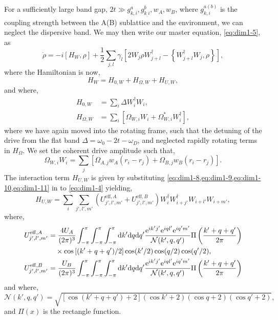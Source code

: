 For a sufficiently large band gap, \(2t \gg g_{k,i}^{a},g_{k_,i}^{b},w_{A},w_{B}\), where \(g_{k,i}^{a(b)}\) is the coupling strength between the A(B) sublattice and the environment, we can neglect the dispersive band. We may then write our master equation, \cref{eq:dim1-5}, as 
\begin{equation}
	\dot{\rho} = -i[H_{W}, \rho] + \frac{1}{2} \sum_{j,l} \gamma_{l} \left[ 2W_{j} \rho W_{j+l}^{\dagger} - \left\{W_{j+l}^{\dagger}W_{j}, \rho\right\}\right],
	\label{eq:dim1-12}
\end{equation}
where the Hamiltonian is now,
\begin{equation}
	H_{W} = H_{0,W} + H_{\Omega,W} + H_{U,W},
	\label{eq:dim1-13}
\end{equation}
and where,
\begin{align}
	H_{0,W} &= \sum_{i} \Delta W_{i}^{\dagger}W_{i}, \label{eq:dim1-14} \\
	H_{\Omega,W} &= \sum_{i} \left[ \Omega_{W,i}W_{i} + \Omega_{W,i}^{*} W_{i}^{\dagger} \right], \label{eq:dim1-15}
\end{align}
where we have again moved into the rotating frame, such that the detuning of the drive from the flat band \(\Delta = \omega_{0} - 2t - \omega_{D}\), and neglected rapidly rotating terms in \(H_{\Omega}\). We set the coherent drive amplitude such that,
\begin{equation}
	\Omega_{W,i}W_{i} = \sum_{j} \left[ \Omega_{A,j}w_{A}(r_{i} - r_{j}) + \Omega_{B,j}w_{B}(r_{i} - r_{j}) \right].
	\label{eq:dim1-16}
\end{equation}
The interaction term \(H_{U,W}\) is given by substituting \cref{eq:dim1-8,eq:dim1-9,eq:dim1-10,eq:dim1-11} in to \cref{eq:dim1-4} yielding,
\begin{equation}
	H_{U,W} = \sum_{i} \sum_{j',l',m'} \left( U_{j',l',m'}^{\mathrm{eff},A} + U_{j',l',m'}^{\mathrm{eff},B} \right)W_{i}^{\dagger}W_{i+j'}^{\dagger}W_{i+l'}W_{i+m'},
	\label{eq:dim1-17}
\end{equation}
where,
\begin{align}
	U_{j',l',m'}^{\mathrm{eff},A} &= \frac{4U_{A}}{(2\pi)^{3}} \int^{\pi}_{-\pi} \int^{\pi}_{-\pi} \int^{\pi}_{-\pi} \mathrm{d}k' \mathrm{d}q \mathrm{d}q' \frac{\mathrm{e}^{ik'j'}\mathrm{e}^{iql'}\mathrm{e}^{iq'm'}}{\mathcal{N}(k',q,q')} \Pi\left( \frac{k'+q+q'}{2\pi} \right) \notag \\
	&\quad \times \cos\left[(k'+q+q')/2\right]\cos(k'/2)\cos(q/2)\cos(q'/2), \label{eq:dim1-18} \\
	U_{j',l',m'}^{\mathrm{eff},B} &= \frac{U_{B}}{(2\pi)^{3}} \int^{\pi}_{-\pi} \int^{\pi}_{-\pi} \int^{\pi}_{-\pi} \mathrm{d}k' \mathrm{d}q \mathrm{d}q' \frac{\mathrm{e}^{ik'j'}\mathrm{e}^{iql'}\mathrm{e}^{iq'm'}}{\mathcal{N}(k',q,q')} \Pi\left( \frac{k'+q+q'}{2\pi} \right) \label{eq:dim1-19}
\end{align}
and where,
\begin{equation}
	\mathcal{N}(k',q,q') = \sqrt{\left[ \cos(k'+q+q') + 2\right](\cos k'+2)(\cos q+2)(\cos q'+2)},
	\label{eq:dim1-20}
\end{equation}
and \(\Pi(x)\) is the rectangle function.

